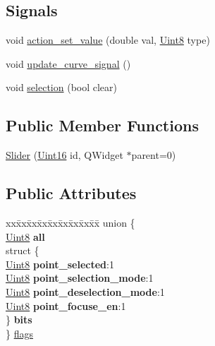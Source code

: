 \subsection*{Signals}
\begin{DoxyCompactItemize}
\item 
void \hyperlink{a00024_a886f07f2c612121bec703581f9398a10}{action\+\_\+set\+\_\+value} (double val, \hyperlink{a00001_a979e3e23b9a449e69ab6a8a83b6042f8}{Uint8} type)
\item 
void \hyperlink{a00024_a49696761b5c638a3b2d58b16af9773e0}{update\+\_\+curve\+\_\+signal} ()
\item 
void \hyperlink{a00024_a66bf875d43a16cf37527ab75c439fd8e}{selection} (bool clear)
\end{DoxyCompactItemize}
\subsection*{Public Member Functions}
\begin{DoxyCompactItemize}
\item 
\hyperlink{a00024_a4f5bd678ed7e386b568121eaeb0ce912}{Slider} (\hyperlink{a00001_aae7407b021d43f7193a81a58cfb3e297}{Uint16} id, Q\+Widget $\ast$parent=0)
\end{DoxyCompactItemize}
\subsection*{Public Attributes}
\begin{DoxyCompactItemize}
\item 
\begin{tabbing}
xx\=xx\=xx\=xx\=xx\=xx\=xx\=xx\=xx\=\kill
union \{\\
\hyperlink{a00001_a979e3e23b9a449e69ab6a8a83b6042f8}{Uint8} {\bfseries all}\\
\>struct \{\\
\hyperlink{a00001_a979e3e23b9a449e69ab6a8a83b6042f8}{Uint8} {\bfseries point\_selected}:1\\
\hyperlink{a00001_a979e3e23b9a449e69ab6a8a83b6042f8}{Uint8} {\bfseries point\_selection\_mode}:1\\
\hyperlink{a00001_a979e3e23b9a449e69ab6a8a83b6042f8}{Uint8} {\bfseries point\_deselection\_mode}:1\\
\hyperlink{a00001_a979e3e23b9a449e69ab6a8a83b6042f8}{Uint8} {\bfseries point\_focuse\_en}:1\\
\>\} {\bfseries bits}\\
\} \hyperlink{a00024_ade6449558d429b66e5ed1381bc9b9060}{flags}\\

\end{tabbing}\end{DoxyCompactItemize}
